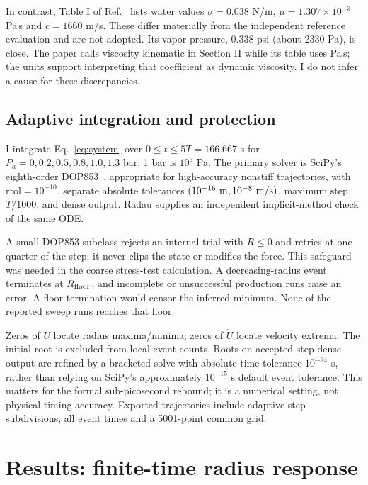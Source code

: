 \documentclass[10pt,a4paper]{article}
\newcommand{\Pa}{P_a}
\begin{document}
In contrast, Table I of Ref.~\cite{sadighi} lists water values $\sigma=0.038$ N/m, $\mu=1.307\times10^{-3}$ Pa\,s and $c=1660$ m/s. These differ materially from the independent reference evaluation and are not adopted. Its vapor pressure, 0.338 psi (about 2330 Pa), is close. The paper calls viscosity kinematic in Section II while its table uses Pa\,s; the units support interpreting that coefficient as dynamic viscosity. I do not infer a cause for these discrepancies.

\subsection{Adaptive integration and protection}
I integrate Eq.~\eqref{eq:system} over $0\leq t\leq5T=166.667$ \textmu s for $\Pa=0,0.2,0.5,0.8,1.0,1.3$ bar; 1 bar is $10^5$ Pa. The primary solver is SciPy's eighth-order DOP853~\cite{scipy}, appropriate for high-accuracy nonstiff trajectories, with $\mathrm{rtol}=10^{-10}$, separate absolute tolerances $(10^{-16}\ {\rm m},10^{-8}\ {\rm m/s})$, maximum step $T/1000$, and dense output. Radau supplies an independent implicit-method check of the same ODE.

A small DOP853 subclass rejects an internal trial with $R\leq0$ and retries at one quarter of the step; it never clips the state or modifies the force. This safeguard was needed in the coarse stress-test calculation. A decreasing-radius event terminates at $R_{\rm floor}$, and incomplete or unsuccessful production runs raise an error. A floor termination would censor the inferred minimum. None of the reported sweep runs reaches that floor.

Zeros of $U$ locate radius maxima/minima; zeros of $\dot U$ locate velocity extrema. The initial root is excluded from local-event counts. Roots on accepted-step dense output are refined by a bracketed solve with absolute time tolerance $10^{-24}$ s, rather than relying on SciPy's approximately $10^{-15}$ s default event tolerance. This matters for the formal sub-picosecond rebound; it is a numerical setting, not physical timing accuracy. Exported trajectories include adaptive-step subdivisions, all event times and a 5001-point common grid.

\newpage
\section{Results: finite-time radius response}
\begin{table}[H]
\centering\scriptsize
\caption{Extrema over five cycles, including endpoints. $U_+=\max(U,0)$ and $|U_-|=|\min(U,0)|$; $N_+,N_-$ count post-initial radius maxima/minima. Zero-drive speeds are roundoff. The 1.3 bar row is a formal ODE result outside physical validity.}
\resizebox{\linewidth}{!}{}
\end{table}
\end{document}
